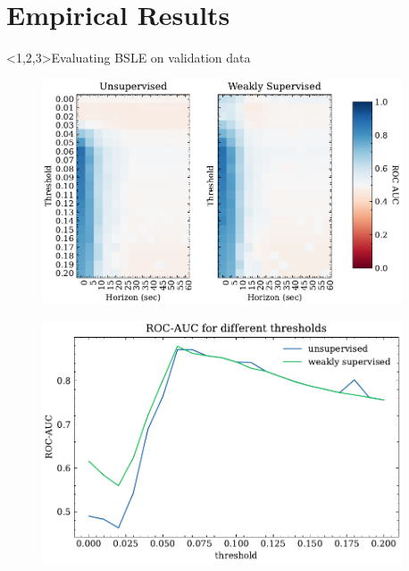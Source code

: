 \documentclass[t]{beamer}
\theoremstyle{definition}
\begin{document}
\section{Empirical Results}
\begin{frame}<1,2,3>{Evaluating BSLE on validation data}
     {
    \begin{figure}
        \centering
        \includegraphics[width=0.95\textwidth]{figs/auc_roc_scores_for_thresholds_and_horizons_sec.pdf}
        \label{fig:my_label}
    \end{figure}
    }
     {
    \begin{figure}
        \centering
        \includegraphics[width=0.95\textwidth]{figs/roc_auc_score_for_thresholds.pdf}
        \label{fig:my_label}
    \end{figure}
    }
     {
    \begin{columns}


\end{columns}}
\end{frame}
\end{document}
